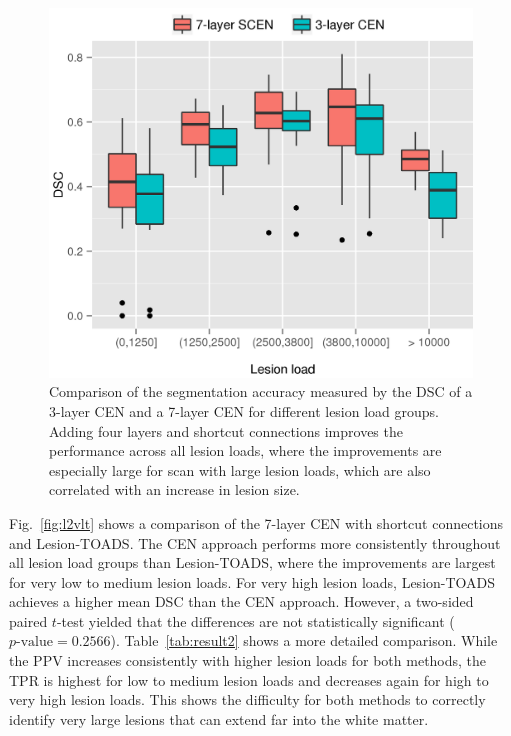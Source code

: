 \begin{figure}[tb]
\centering
\includegraphics[width=\columnwidth]{figures/boxplot_L1vsL2}

\caption{Comparison of the segmentation accuracy measured by the DSC of a
3-layer CEN and a 7-layer CEN for different lesion load groups. Adding four layers and
shortcut connections improves the performance across all lesion loads, where the
improvements are especially large for scan with large lesion loads, which are
also correlated with an increase in lesion size.}

\label{fig:l1vl2}
\end{figure}

Fig.~\ref{fig:l2vlt} shows a comparison of the 7-layer CEN with shortcut
connections and Lesion-TOADS. The CEN approach performs more consistently
throughout all lesion load groups than Lesion-TOADS, where the improvements are
largest for very low to medium lesion loads. For very high lesion loads,
Lesion-TOADS achieves a higher mean DSC than the CEN approach. However, a
two-sided paired $t$-test yielded that the differences are not statistically
significant ($p\text{-value}=0.2566$). Table~\ref{tab:result2} shows a more
detailed comparison. While the PPV increases consistently with higher lesion
loads for both methods, the TPR is highest for low to medium lesion loads and
decreases again for high to very high lesion loads. This shows the difficulty
for both methods to correctly identify very large lesions that can extend far
into the white matter.

